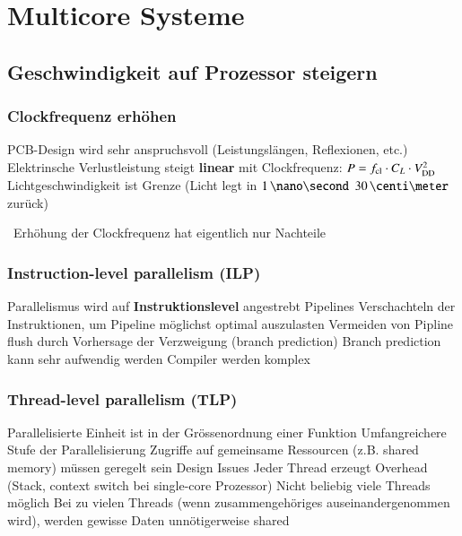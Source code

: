\section{Multicore Systeme}

\subsection{Geschwindigkeit auf Prozessor steigern}

\subsubsection{Clockfrequenz erhöhen}

\begin{outline}
    \1 PCB-Design wird sehr anspruchsvoll (Leistungslängen, Reflexionen, etc.)
    \1 Elektrinsche Verlustleistung steigt \textbf{linear} mit Clockfrequenz: $P = f_{\rm cl} \cdot C_L \cdot V_{\rm DD}^2$
    \1 Lichtgeschwindigkeit ist Grenze (Licht legt in $1 \, \nano \second$ $30 \, \centi \meter$ zurück)
\end{outline}

\vspace{0.1cm}

\textrightarrow\ Erhöhung der Clockfrequenz hat eigentlich nur Nachteile

\columnbreak


\subsubsection{Instruction-level parallelism (ILP)}

\begin{outline}
    \1 Parallelismus wird auf \textbf{Instruktionslevel} angestrebt
        \2 Pipelines
        \2 Verschachteln der Instruktionen, um Pipeline möglichst optimal auszulasten
        \2 Vermeiden von Pipline flush durch Vorhersage der Verzweigung (branch prediction)
    \1[-] Branch prediction kann sehr aufwendig werden
    \1[-] Compiler werden komplex
\end{outline}


\subsubsection{Thread-level parallelism (TLP)}

\begin{outline}
    \1 Parallelisierte Einheit ist in der Grössenordnung einer Funktion
        \2 Umfangreichere Stufe der Parallelisierung
    \1 Zugriffe auf gemeinsame Ressourcen (z.B. shared memory) müssen geregelt sein
    \1 Design Issues
        \2 Jeder Thread erzeugt Overhead (Stack, context switch bei single-core Prozessor)
        \2 Nicht beliebig viele Threads möglich
        \2 Bei zu vielen Threads (wenn zusammengehöriges auseinandergenommen wird), werden
            gewisse Daten unnötigerweise shared
\end{outline}


